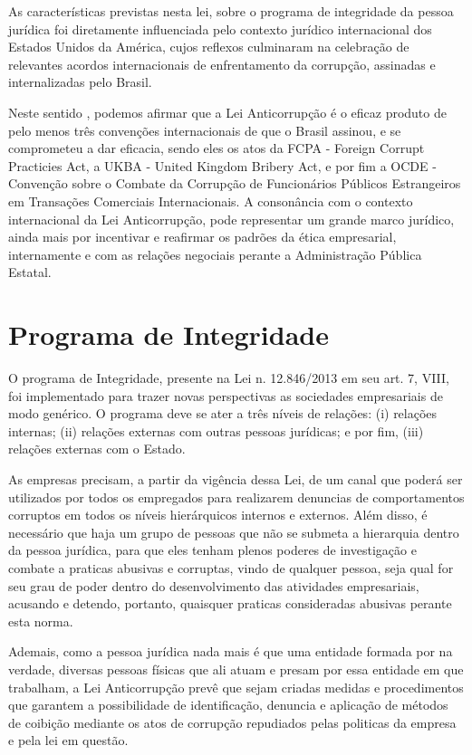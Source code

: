As características previstas nesta lei, sobre o programa de integridade da pessoa jurídica foi diretamente influenciada pelo contexto jurídico internacional dos Estados Unidos da América, cujos reflexos culminaram na celebração de relevantes acordos internacionais de enfrentamento da corrupção, assinadas e internalizadas pelo Brasil. 

Neste sentido , podemos afirmar que a Lei Anticorrupção é o eficaz produto de pelo menos três convenções internacionais de que o Brasil assinou, e se comprometeu a dar eficacia, sendo eles os atos da FCPA - Foreign Corrupt Practicies Act, a UKBA - United Kingdom Bribery Act, e por fim a OCDE - Convenção sobre o Combate da Corrupção de Funcionários Públicos Estrangeiros em Transações Comerciais Internacionais. A consonância com o contexto internacional da Lei Anticorrupção, pode representar um grande marco jurídico, ainda mais por incentivar e reafirmar os padrões da ética empresarial, internamente e com as relações negociais perante a Administração Pública Estatal. 

\section{Programa de Integridade}

O programa de Integridade, presente na Lei n. 12.846/2013 em seu art. 7, VIII, foi implementado para trazer novas perspectivas as sociedades empresariais de modo genérico.  O programa deve se ater a três níveis de relações: (i) relações internas; (ii) relações externas com outras pessoas jurídicas; e por fim, (iii) relações externas com o Estado.

As empresas precisam, a partir da vigência dessa Lei, de um canal que poderá ser utilizados por todos os empregados para realizarem denuncias de comportamentos corruptos em todos os níveis hierárquicos internos e externos. Além disso, é necessário que haja um grupo de pessoas que não se submeta a hierarquia dentro da pessoa jurídica, para que eles tenham plenos poderes de investigação e combate a praticas abusivas e corruptas, vindo de qualquer pessoa, seja qual for seu grau de poder dentro do desenvolvimento das atividades empresariais, acusando e detendo, portanto, quaisquer praticas consideradas abusivas perante esta norma. 

Ademais, como a pessoa jurídica nada mais é que uma entidade formada por na verdade, diversas pessoas físicas que ali atuam e presam por essa entidade em que trabalham, a Lei Anticorrupção prevê que sejam criadas medidas e procedimentos que garantem a possibilidade de identificação, denuncia e aplicação de métodos de coibição mediante os atos de corrupção repudiados pelas politicas da empresa e pela lei em questão. 

